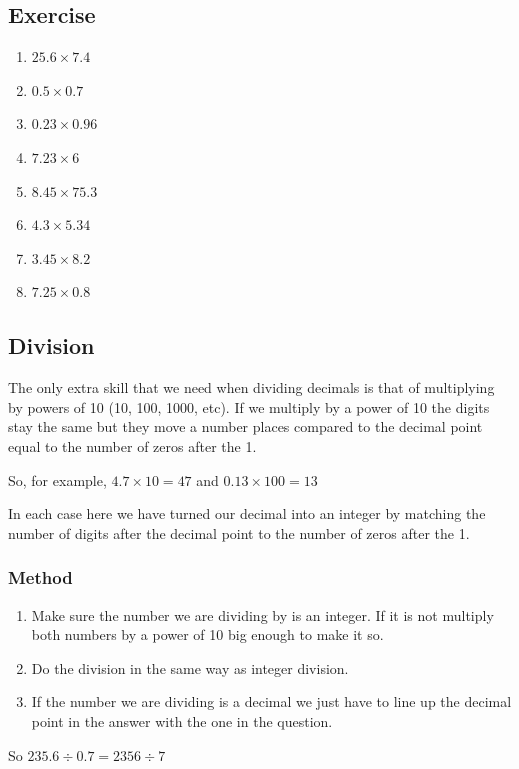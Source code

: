 \subsection{Exercise}
\begin{multicols}{2}
\begin{enumerate}
	\item $25.6 \times 7.4$
	\item $0.5 \times 0.7$
	\item $0.23 \times 0.96$
	\item $7.23 \times 6$
	\item $8.45 \times 75.3$
	\item $4.3 \times 5.34$
	\item $3.45 \times 8.2$
	\item $7.25 \times 0.8$
\end{enumerate}
\end{multicols}
\subsection{Division}
The only extra skill that we need when dividing decimals is that of multiplying by powers of 10 (10, 100, 1000, etc).  If we multiply by a power of 10 the digits stay the same but they move a number places compared to the decimal point equal to the number of zeros after the 1.

So, for example, $4.7 \times 10 = 47$ and $0.13 \times 100 = 13$

In each case here we have turned our decimal into an integer by matching the number of digits after the decimal point to the number of zeros after the 1.

\subsubsection{Method}
\begin{enumerate}
	\item Make sure the number we are dividing by is an integer.  If it is not multiply both numbers by a power of 10 big enough to make it so.
	\item Do the division in the same way as integer division.
	\item If the number we are dividing is a decimal we just have to line up the decimal point in the answer with the one in the question.
\end{enumerate}

So $235.6 \div 0.7 = 2356 \div 7$

